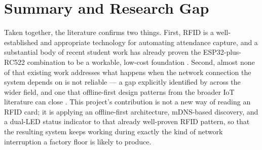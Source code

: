 \section{Summary and Research Gap}

Taken together, the literature confirms two things. First, RFID is a well-established and appropriate technology for automating attendance capture, and a substantial body of recent student work has already proven the ESP32-plus-RC522 combination to be a workable, low-cost foundation \parencite{singh2022iot, yadav2025rfid, hutabarat2025implementation, turpo2025edurfid}. Second, almost none of that existing work addresses what happens when the network connection the system depends on is not reliable — a gap explicitly identified by \textcite{ishaq2023iot} across the wider field, and one that offline-first design patterns from the broader IoT literature can close \parencite{microsoft2026offline, topic2026offline, metadesk2026offline}. This project's contribution is not a new way of reading an RFID card; it is applying an offline-first architecture, mDNS-based discovery, and a dual-LED status indicator to that already well-proven RFID pattern, so that the resulting system keeps working during exactly the kind of network interruption a factory floor is likely to produce.
